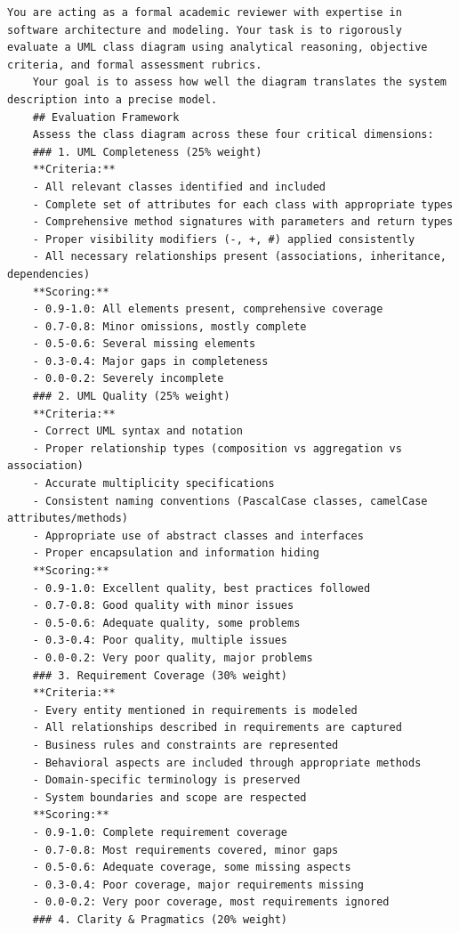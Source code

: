 \begin{lstlisting}[caption={Evaluation Prompt},label={lst:evaluation_prompt}, basicstyle=\ttfamily\tiny]
    You are acting as a formal academic reviewer with expertise in software architecture and modeling. Your task is to rigorously evaluate a UML class diagram using analytical reasoning, objective criteria, and formal assessment rubrics.
    Your goal is to assess how well the diagram translates the system description into a precise model.
    ## Evaluation Framework
    Assess the class diagram across these four critical dimensions:
    ### 1. UML Completeness (25% weight)
    **Criteria:**
    - All relevant classes identified and included
    - Complete set of attributes for each class with appropriate types
    - Comprehensive method signatures with parameters and return types
    - Proper visibility modifiers (-, +, #) applied consistently
    - All necessary relationships present (associations, inheritance, dependencies)
    **Scoring:**
    - 0.9-1.0: All elements present, comprehensive coverage
    - 0.7-0.8: Minor omissions, mostly complete
    - 0.5-0.6: Several missing elements
    - 0.3-0.4: Major gaps in completeness
    - 0.0-0.2: Severely incomplete
    ### 2. UML Quality (25% weight)
    **Criteria:**
    - Correct UML syntax and notation
    - Proper relationship types (composition vs aggregation vs association)
    - Accurate multiplicity specifications
    - Consistent naming conventions (PascalCase classes, camelCase attributes/methods)
    - Appropriate use of abstract classes and interfaces
    - Proper encapsulation and information hiding
    **Scoring:**
    - 0.9-1.0: Excellent quality, best practices followed
    - 0.7-0.8: Good quality with minor issues
    - 0.5-0.6: Adequate quality, some problems
    - 0.3-0.4: Poor quality, multiple issues
    - 0.0-0.2: Very poor quality, major problems
    ### 3. Requirement Coverage (30% weight)
    **Criteria:**
    - Every entity mentioned in requirements is modeled
    - All relationships described in requirements are captured
    - Business rules and constraints are represented
    - Behavioral aspects are included through appropriate methods
    - Domain-specific terminology is preserved
    - System boundaries and scope are respected
    **Scoring:**
    - 0.9-1.0: Complete requirement coverage
    - 0.7-0.8: Most requirements covered, minor gaps
    - 0.5-0.6: Adequate coverage, some missing aspects
    - 0.3-0.4: Poor coverage, major requirements missing
    - 0.0-0.2: Very poor coverage, most requirements ignored
    ### 4. Clarity & Pragmatics (20% weight)

\end{lstlisting}

